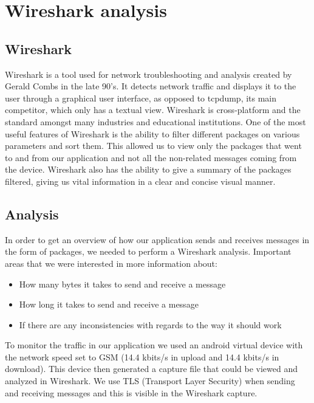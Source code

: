 \section{Wireshark analysis}

\subsection{Wireshark}
Wireshark is a tool used for network troubleshooting and analysis created by Gerald Combs in the late 90’s. It detects network traffic and displays it to the user through a graphical user interface, as opposed to tcpdump, its main competitor, which only has a textual view. Wireshark is cross-platform and the standard amongst many industries and educational institutions. 
\newline
\newline
One of the most useful features of Wireshark is the ability to filter different packages on various parameters and sort them. This allowed us to view only the packages that went to and from our application and not all the non-related messages coming from the device. Wireshark also has the ability to give a summary of the packages filtered, giving us vital information in a clear and concise visual manner. 

\subsection{Analysis}
In order to get an overview of how our application sends and receives messages in the form of packages, we needed to perform a Wireshark analysis. Important areas that we were interested in more information about:
\begin{itemize}
\item{}How many bytes it takes to send and receive a message
\item{}How long it takes to send and receive a message
\item{}If there are any inconsistencies with regards to the way it should work
\end{itemize}

To monitor the traffic in our application we used an android virtual device with the network speed set to GSM (14.4 kbits/s in upload and 14.4 kbits/s in download). This device then generated a capture file that could be viewed and analyzed in Wireshark.
\newline
\newline
We use TLS (Transport Layer Security) when sending and receiving messages and this is visible in the Wireshark capture. 

